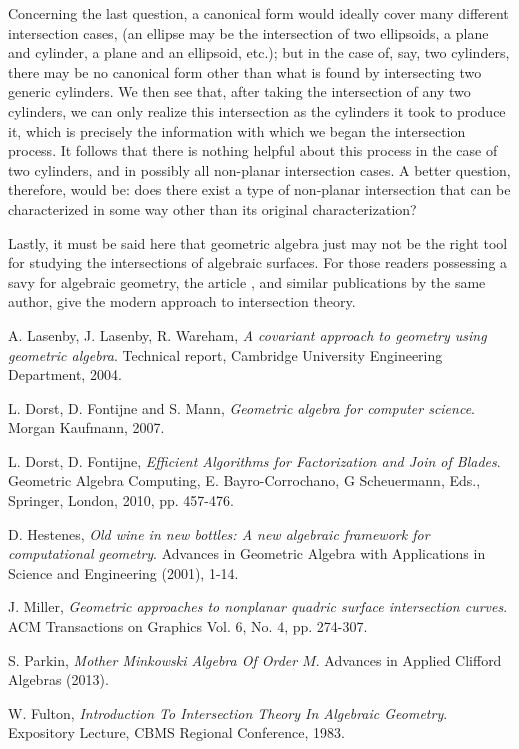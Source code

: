 \documentclass{birkjour}
\theoremstyle{definition}
\theoremstyle{remark}
\numberwithin{equation}{section}
\begin{document}
Concerning the last question, a canonical
form would ideally cover many different intersection cases, (an ellipse
may be the intersection of two ellipsoids, a plane and cylinder, a plane and an ellipsoid, etc.); but
in the case of, say, two cylinders, there may be no canonical form other than what
is found by intersecting two generic cylinders.  We then see that,
after taking the intersection of any two cylinders, we can only realize this
intersection as the cylinders it took to produce it, which is precisely the
information with which we began the intersection process.  It follows that
there is nothing helpful about this process in the case of two cylinders,
and in possibly all non-planar intersection cases.  A better question, therefore,
would be: does there exist a type of non-planar intersection that
can be characterized in some way other than its original characterization?

Lastly, it must be said here that geometric algebra just may not be the right tool
for studying the intersections of algebraic surfaces.  For those readers possessing a savy
for algebraic geometry, the article \cite{Fulton83}, and similar publications by the same author,
give the modern approach to intersection theory.

\begin{thebibliography}{9}

A. Lasenby, J. Lasenby, R. Wareham, {\it A covariant approach
to geometry using geometric algebra}.  Technical report, Cambridge University
Engineering Department, 2004.

L. Dorst, D. Fontijne and S. Mann, {\it Geometric algebra for computer
science}. Morgan Kaufmann, 2007.

L. Dorst, D. Fontijne, {\it Efficient Algorithms for Factorization and Join
of Blades}.  Geometric Algebra Computing, E. Bayro-Corrochano, G Scheuermann, Eds.,
Springer, London, 2010, pp. 457-476.

D. Hestenes, {\it Old wine in new bottles: A new algebraic
framework for computational geometry}. Advances in Geometric
Algebra with Applications in Science and Engineering (2001), 1-14.

J. Miller, {\it Geometric approaches to nonplanar quadric surface
intersection curves}. ACM Transactions on Graphics Vol. 6, No. 4, pp.
274-307.

S. Parkin, {\it Mother Minkowski Algebra Of Order $M$}.
Advances in Applied Clifford Algebras (2013).

W. Fulton, {\it Introduction To Intersection Theory In Algebraic Geometry}.
Expository Lecture, CBMS Regional Conference, 1983.

\end{thebibliography}
\end{document}
